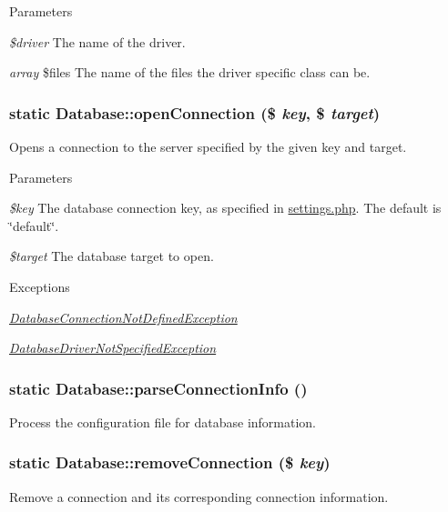 \begin{DoxyParams}{Parameters}
\item[{\em \$driver}]The name of the driver. \item[{\em array}]\$files The name of the files the driver specific class can be. \end{DoxyParams}
\hypertarget{classDatabase_a40724407e492d149e9b45e7d5e90ec37}{
\subsubsection[{openConnection}]{\setlength{\rightskip}{0pt plus 5cm}static Database::openConnection (\$ {\em key}, \/  \$ {\em target})}}
\label{classDatabase_a40724407e492d149e9b45e7d5e90ec37}
Opens a connection to the server specified by the given key and target.


\begin{DoxyParams}{Parameters}
\item[{\em \$key}]The database connection key, as specified in \hyperlink{settings_8php}{settings.php}. The default is \char`\"{}default\char`\"{}. \item[{\em \$target}]The database target to open.\end{DoxyParams}

\begin{DoxyExceptions}{Exceptions}
\item[{\em \hyperlink{classDatabaseConnectionNotDefinedException}{DatabaseConnectionNotDefinedException}}]\item[{\em \hyperlink{classDatabaseDriverNotSpecifiedException}{DatabaseDriverNotSpecifiedException}}]\end{DoxyExceptions}
\hypertarget{classDatabase_a65d7ffd8cc0b81ead0e2a6ca0836343c}{
\subsubsection[{parseConnectionInfo}]{\setlength{\rightskip}{0pt plus 5cm}static Database::parseConnectionInfo ()}}
\label{classDatabase_a65d7ffd8cc0b81ead0e2a6ca0836343c}
Process the configuration file for database information. \hypertarget{classDatabase_a5c2f9463e38304080a2d555a588010ef}{
\subsubsection[{removeConnection}]{\setlength{\rightskip}{0pt plus 5cm}static Database::removeConnection (\$ {\em key})}}
\label{classDatabase_a5c2f9463e38304080a2d555a588010ef}
Remove a connection and its corresponding connection information.


